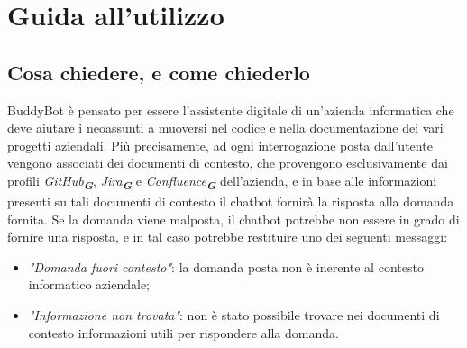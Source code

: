 
\section{Guida all’utilizzo}
\label{sec:guida_utilizzo}


\subsection{Cosa chiedere, e come chiederlo}
BuddyBot è pensato per essere l'assistente digitale di un'azienda informatica che deve aiutare i neoassunti a muoversi nel codice
e nella documentazione dei vari progetti aziendali. Più precisamente, ad ogni interrogazione posta dall'utente vengono associati dei
documenti di contesto, che provengono esclusivamente dai profili \emph{GitHub}\textsubscript{\textbf{\textit{G}}},
\emph{Jira}\textsubscript{\textbf{\textit{G}}} e \emph{Confluence}\textsubscript{\textbf{\textit{G}}} dell'azienda, e in base alle
informazioni presenti su tali documenti di contesto il chatbot fornirà la risposta alla domanda fornita.
Se la domanda viene malposta, il chatbot potrebbe non essere in grado di fornire una risposta, e in tal caso potrebbe restituire
uno dei seguenti messaggi:
\begin{itemize}
    \item \emph{"Domanda fuori contesto"}: la domanda posta non è inerente al contesto informatico aziendale;
    \item \emph{"Informazione non trovata"}: non è stato possibile trovare nei documenti di contesto informazioni utili per rispondere alla domanda.
\end{itemize}

